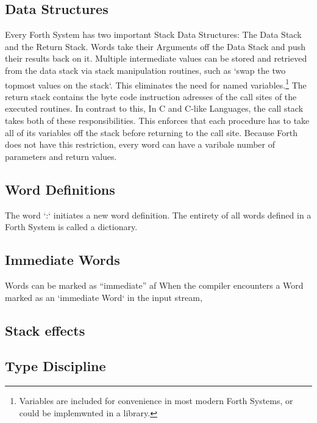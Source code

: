 \documentclass{llncs}
\begin{document}
\subsection{Data Structures}
Every Forth System has two important Stack Data Structures: The Data Stack and the Return Stack. Words take their Arguments off the Data Stack and push their results back on it. Multiple intermediate values can be stored and retrieved from the data stack via stack manipulation routines, such as `swap the two topmost values on the stack`. This eliminates the need for named variables.\footnote{Variables are included for convenience in most modern Forth Systems, or could be implemwnted in a library.}
The return stack contains the byte code instruction adresses of the call sites of the executed routines.
In contrast to this, In C and C-like Languages, the call stack takes both of these responsibilities. This enforces that each procedure has to take all of its variables off the stack before returning to the call site.
Because Forth does not have this restriction, every word can have a varibale number of parameters and return values.

\subsection{Word Definitions}

The word `:` initiates a new word definition. 
The entirety of all words defined in a Forth System is called a dictionary.



\subsection{Immediate Words}

Words can be marked as ``immediate''  af
When the compiler encounters a Word marked as an `immediate Word` in the input stream, 

\subsection{Stack effects}



\subsection{Type Discipline}
\end{document}
